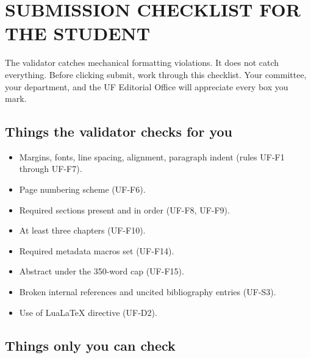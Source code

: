 \chapter{SUBMISSION CHECKLIST FOR THE STUDENT}\label{app:checklist}

The validator catches mechanical formatting violations. It does not
catch everything. Before clicking submit, work through this checklist.
Your committee, your department, and the UF Editorial Office will
appreciate every box you mark.

\section{Things the validator checks for you}

\begin{itemize}
    \item Margins, fonts, line spacing, alignment, paragraph indent
          (rules UF-F1 through UF-F7).
    \item Page numbering scheme (UF-F6).
    \item Required sections present and in order (UF-F8, UF-F9).
    \item At least three chapters (UF-F10).
    \item Required metadata macros set (UF-F14).
    \item Abstract under the 350-word cap (UF-F15).
    \item Broken internal references and uncited bibliography entries
          (UF-S3).
    \item Use of LuaLaTeX directive (UF-D2).
\end{itemize}

\section{Things only you can check}

